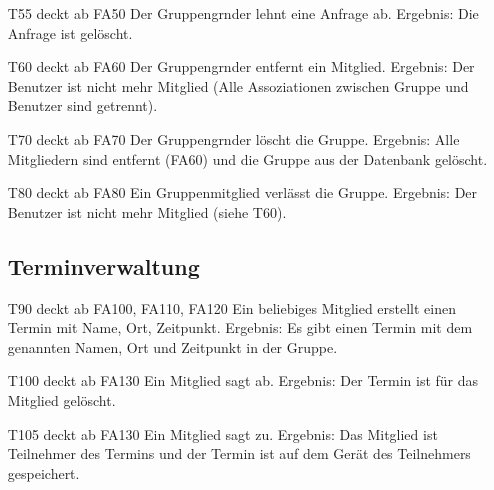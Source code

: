 \documentclass{scrartcl}
\begin{document}
\begin{itemize}
		\item[T55] deckt ab FA50  \newline
		Der \gls{Gruppengrnder} lehnt eine Anfrage ab. \newline
		Ergebnis: Die Anfrage ist gelöscht.

		\item[T60] deckt ab FA60  \newline
		Der \gls{Gruppengrnder} entfernt ein Mitglied.  \newline
		Ergebnis: Der Benutzer ist nicht mehr Mitglied (Alle Assoziationen zwischen Gruppe und Benutzer sind getrennt).

		\item[T70] deckt ab FA70  \newline
		Der \gls{Gruppengrnder} löscht die Gruppe.  \newline
		Ergebnis: Alle Mitgliedern sind entfernt (FA60) und die Gruppe aus der Datenbank gelöscht.

		\item[T80] deckt ab FA80  \newline
		Ein Gruppenmitglied verlässt die Gruppe.  \newline
		Ergebnis: Der Benutzer ist nicht mehr \gls{Mitglied} (siehe T60).

	\subsection{Terminverwaltung}

		\item[T90] deckt ab FA100, FA110, FA120  \newline
		Ein beliebiges \gls{Mitglied} erstellt einen Termin mit Name, Ort, Zeitpunkt.  \newline
		Ergebnis: Es gibt einen Termin mit dem genannten Namen, Ort und Zeitpunkt in der Gruppe.
		
		\item [T100] deckt ab FA130  \newline
		Ein \gls{Mitglied} sagt ab.  \newline
		Ergebnis: Der Termin ist für das Mitglied gelöscht.

		\item[T105] deckt ab FA130  \newline
		Ein Mitglied sagt zu.  \newline
		Ergebnis: Das Mitglied ist \gls{Teilnehmer} des Termins und der Termin ist auf dem Gerät des Teilnehmers gespeichert.


\end{itemize}
\end{document}
